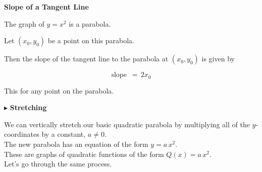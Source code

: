 \documentclass{ximera}
\begin{document}
\begin{conclusion} \textbf{\textcolor{green!50!black}{Slope of a Tangent Line}} 


The graph of $y = x^2$ is a parabola.

Let $(x_0, y_0)$ be a point on this parabola.

Then the slope of the tangent line to the parabola at $(x_0, y_0)$ is given by 



\[ \text{slope } \, = \, 2 x_0  \]


\end{conclusion}
This for any point on the parabola.



























$\blacktriangleright$ \textbf{Stretching}



We can vertically stretch our basic quadratic parabola by multiplying all of the $y$-coordinates by a constant, $a \ne 0$. \\


The new parabola has an equation of the form $y = a \, x^2$. \\

These are graphs of quadratic functions of the form $Q(x) = a \, x^2$. \\


Let's go through the same process. \\
\end{document}
